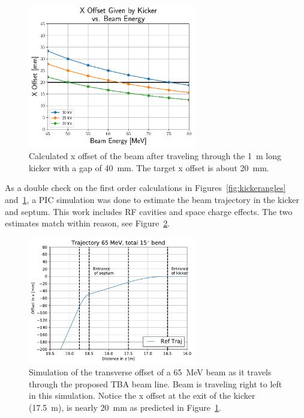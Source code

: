 \documentclass[aps,prab,preprint,groupedaddress,linenumbers]{revtex4-2}
\begin{document}
\begin{figure}%
	\begin{center}
		\includegraphics[width=0.65\textwidth]{XoffsetVsEnergy}
		\caption{Calculated x offset of the beam after traveling
			through the \SI{1}{m} long kicker with a gap of \SI{40}{mm}.
			The target x offset is about \SI{20}{mm}.}
		\label{fig:kickeroffset}
	\end{center}
\end{figure}
As a double check on the first order calculations in Figures~\ref{fig:kickerangles} and~\ref{fig:kickeroffset}, 
a PIC simulation was done to estimate the beam 
trajectory in the kicker and septum. 
This work includes RF cavities and space charge effects.
The two estimates match within reason, see Figure~\ref{fig:beamtraj}. 
\begin{figure}
	\begin{center}
		\includegraphics[width=0.65\textwidth]{tba_trajectory}
		\caption{Simulation of the transverse offset of a \SI{65}{MeV} beam as 
			it travels through the proposed TBA beam line. 
			Beam is traveling right to left in this simulation. 
			Notice the x offset at the exit of the kicker (\SI{17.5}{m}), 
			is nearly \SI{20}{mm} as predicted in Figure~\ref{fig:kickeroffset}.}
		\label{fig:beamtraj}
	\end{center}
\end{figure}
\end{document}
